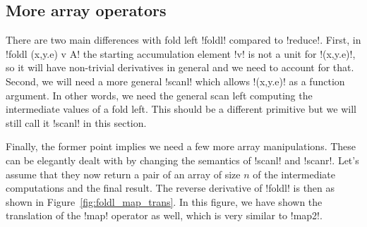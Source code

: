 \subsection{More array operators}
\label{sub:lift_more_arr_op}

There are two main differences with fold left !foldl! compared to !reduce!. 
First, in !foldl (x,y.e) v A! the starting accumulation element !v! is not a unit for !(x,y.e)!,
so it will have non-trivial derivatives in general and we need to account for that.
Second, we will need a more general !scanl! which allows !(x,y.e)! as a function argument. 
In other words, we need the general scan left computing the intermediate values of a fold left.
This should be a different primitive but we will still call it !scanl! in this section.

Finally, the former point implies we need a few more array manipulations.
These can be elegantly dealt with by changing the semantics of !scanl! and !scanr!. 
Let's assume that they now return a pair of an array of size $n$ 
of the intermediate computations and the final result.
The reverse derivative of !foldl! is then as shown in Figure~\ref{fig:foldl_map_trans}.
In this figure, we have shown the translation of the !map! operator as well, which is very similar to !map2!.

